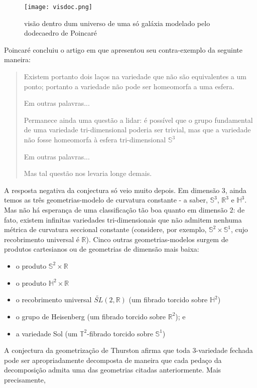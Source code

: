 \begin{figure}[H]
\centering
\texttt{[image: visdoc.png]}
\caption{visão dentro dum universo de uma só galáxia modelado pelo dodecaedro de Poincaré}
\end{figure}
Poincaré concluiu o artigo em que apresentou seu contra-exemplo da seguinte maneira:

\blockquote{
Existem portanto dois laços na variedade que não são equivalentes a um ponto; portanto a variedade não pode ser homeomorfa a uma esfera. \par 
Em outras palavras...  \par 
Permanece ainda uma questão a lidar: é possível que o grupo fundamental de uma variedade tri-dimensional poderia ser trivial, mas que a variedade não fosse homeomorfa à esfera tri-dimensional $\mathbb{S}^3$  \par 
Em outras palavras...  \par 
Mas tal questão nos levaria longe demais.
 }
 A resposta negativa da conjectura só veio muito depois. Em dimensão $3$, ainda temos as três geometrias-modelo de curvatura constante - a saber, $\mathbb{S}^3$, $\mathbb{R}^3$ e $\mathbb{H}^3$. Mas não há esperança de uma classificação tão boa quanto em dimensão $2$: de fato, existem infinitas variedades tri-dimensionais que não admitem nenhuma métrica de curvatura seccional constante (considere, por exemplo, $\mathbb{S}^2 \times \mathbb{S}^1$, cujo recobrimento universal é $\mathbb{R}$). Cinco outras geometrias-modelos surgem de produtos cartesianos ou  de geometrias de dimensão mais baixa:
\begin{itemize}
\item o produto $\mathbb{S}^2 \times \mathbb{R}$
\item o produto $\mathbb{H}^2 \times \mathbb{R}$
\item o recobrimento universal $\widetilde{S L}(2, \mathbb{R})$ (um fibrado torcido sobre $\mathbb{H}^2$)
\item o grupo de Heisenberg (um fibrado torcido sobre $\mathbb{R}^2$); e
\item a variedade Sol (um $\mathbb{T}^2$-fibrado torcido sobre $\mathbb{S}^1$)
\end{itemize}
A conjectura da geometrização de Thurston afirma que toda $3$-variedade fechada pode ser apropriadamente decomposta de maneira que cada pedaço da decomposição admita uma das geometrias citadas anteriormente. Mais precisamente, 
